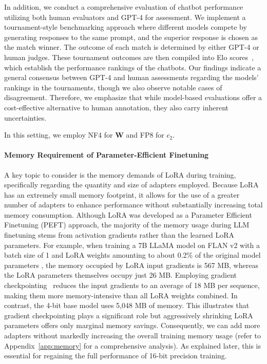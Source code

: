 In addition, we conduct a comprehensive evaluation of chatbot performance utilizing both human evaluators and GPT-4 for assessment. We implement a tournament-style benchmarking approach where different models compete by generating responses to the same prompt, and the superior response is chosen as the match winner. The outcome of each match is determined by either GPT-4 or human judges. These tournament outcomes are then compiled into Elo scores~\citep{elo1967proposed, elo1978rating}, which establish the performance rankings of the chatbots. Our findings indicate a general consensus between GPT-4 and human assessments regarding the models' rankings in the tournaments, though we also observe notable cases of disagreement. Therefore, we emphasize that while model-based evaluations offer a cost-effective alternative to human annotation, they also carry inherent uncertainties.

In this setting, we employ NF4 for $\mathbf{W}$ and FP8 for $c_2$.

\paragraph{Memory Requirement of Parameter-Efficient Finetuning} A key topic to consider is the memory demands of LoRA during training, specifically regarding the quantity and size of adapters employed. Because LoRA has an extremely small memory footprint, it allows for the use of a greater number of adapters to enhance performance without substantially increasing total memory consumption. Although LoRA was developed as a Parameter Efficient Finetuning (PEFT) approach, the majority of the memory usage during LLM finetuning stems from activation gradients rather than the learned LoRA parameters. For example, when training a 7B LLaMA model on FLAN v2 with a batch size of 1 and LoRA weights amounting to about 0.2\% of the original model parameters \citep{hu2021lora,liu2022few}, the memory occupied by LoRA input gradients is 567 MB, whereas the LoRA parameters themselves occupy just 26 MB. Employing gradient checkpointing~\citep{chen2016training} reduces the input gradients to an average of 18 MB per sequence, making them more memory-intensive than all LoRA weights combined. In contrast, the 4-bit base model uses 5,048 MB of memory. This illustrates that gradient checkpointing plays a significant role but aggressively shrinking LoRA parameters offers only marginal memory savings. Consequently, we can add more adapters without markedly increasing the overall training memory usage (refer to Appendix~\ref{app:memory} for a comprehensive analysis). As explained later, this is essential for regaining the full performance of 16-bit precision training.

